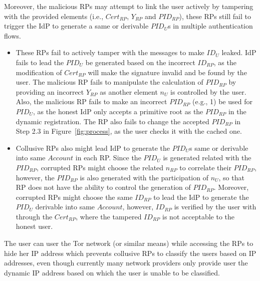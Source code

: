 Moreover, the malicious RPs may attempt to link the user actively by tampering with the provided elements (i.e., $Cert_{RP}$, $Y_{RP}$ and $PID_{RP}$), these RPs still fail to trigger the IdP to generate a same or derivable $PID_U$s in multiple authentication flows.
\begin{itemize}
\item These RPs fail to actively tamper with the messages to make $ID_U$ leaked. IdP fails to lead the $PID_U$ be generated based on the incorrect $ID_{RP}$, as the modification of  $Cert_{RP}$ will make the signature invalid and be found by the user. The malicious RP fails to manipulate  the calculation of $PID_{RP}$ by providing an incorrect $Y_{RP}$ as another element $n_U$ is  controlled by the user. Also, the malicious RP fails to make an incorrect $PID_{RP}$ (e.g., 1)  be used for $PID_U$, as the honest IdP only accepts a primitive root as the $PID_{RP}$ in the dynamic registration. The RP also fails to change the accepted $PID_{RP}$ in Step 2.3 in Figure~\ref{fig:process}, as the user checks it with the cached one.
\item Collusive RPs also might lead IdP to generate the $PID_U$s same or  derivable into same $Account$ in each RP. Since the $PID_U$ is generated related with the $PID_{RP}$, corrupted RPs might choose the related $n_{RP}$ to correlate their $PID_{RP}$, however, the $PID_{RP}$ is also generated with the participation of $n_{U}$, so that RP does not have the ability to control the generation of $PID_{RP}$. Moreover, corrupted RPs might choose the same $ID_{RP}$ to lead the IdP to generate the $PID_U$ derivable into same $Account$, however, $ID_{RP}$ is verified by the user with through the $Cert_{RP}$, where the tampered $ID_{RP}$ is not acceptable to the honest user.
\end{itemize}

The user can user the Tor network (or similar means) while accessing the RPs to hide her IP address
which prevents collusive RPs to classify the users based on IP addresses, even though currently many network providers only provide user the dynamic IP address based on which the user is unable to be classified.


